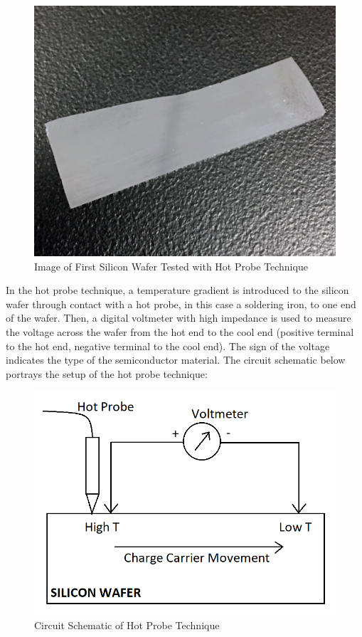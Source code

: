 \documentclass{article}
\begin{document}
	\begin{figure}[h!]
		\centering
		\includegraphics[scale=0.1]{../images/wafer.JPG}
		\caption{Image of First Silicon Wafer Tested with Hot Probe Technique}
		\label{fig:wafer}
	\end{figure}

	\FloatBarrier
	
	In the hot probe technique, a temperature gradient is introduced to the silicon wafer through contact with a hot probe, in this case a soldering iron, to one end of the wafer. Then, a digital voltmeter with high impedance is used to measure the voltage across the wafer from the hot end to the cool end (positive terminal to the hot end, negative terminal to the cool end). The sign of the voltage indicates the type of the semiconductor material. The circuit schematic below portrays the setup of the hot probe technique:

	\FloatBarrier
	
	\begin{figure}[h!]
		\centering
		\includegraphics[scale=0.7]{../images/hot_probe_schematic.PNG}
		\caption{Circuit Schematic of Hot Probe Technique}
		\label{fig:hot_probe_schematic}
	\end{figure}
\end{document}
